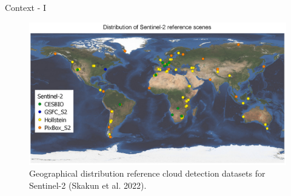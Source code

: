 \begin{frame}{Context - I}
	\begin{center}
		\begin{figure}
			\centering
			\includegraphics[width=0.85\linewidth]{images/intro_fig01.png}
			\caption[fig:introfig01]{Geographical distribution reference cloud detection datasets for Sentinel-2 (Skakun et al. 2022).}
			\label{fig:introfig01}
		\end{figure}
	\end{center}
\end{frame}


